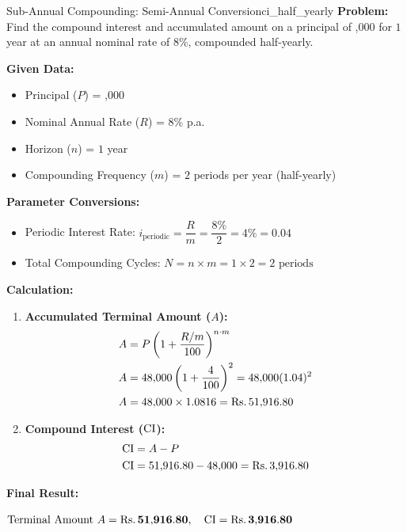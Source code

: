 \begin{example}{Sub-Annual Compounding: Semi-Annual Conversion}{ci_half_yearly}
\textbf{Problem:} \\
Find the compound interest and accumulated amount on a principal of ,000 for $1$ year at an annual nominal rate of $8\%$, compounded half-yearly.

\tcbline
\textbf{Given Data:}
\begin{itemize}[noitemsep]
    \item Principal ($P$) = ,000
    \item Nominal Annual Rate ($R$) = $8\%$ p.a.
    \item Horizon ($n$) = $1$ year
    \item Compounding Frequency ($m$) = $2$ periods per year (half-yearly)
\end{itemize}

\textbf{Parameter Conversions:}
\begin{itemize}[noitemsep]
    \item Periodic Interest Rate: $i_{\text{periodic}} = \dfrac{R}{m} = \dfrac{8\%}{2} = 4\% = 0.04$
    \item Total Compounding Cycles: $N = n \times m = 1 \times 2 = 2\text{ periods}$
\end{itemize}

\textbf{Calculation:}
\begin{enumerate}[leftmargin=*]
    \item \textbf{Accumulated Terminal Amount ($A$):}
    \begin{align*}
        A &= P\left(1 + \frac{R/m}{100}\right)^{n \cdot m} \\
        A &= 48{,}000\left(1 + \frac{4}{100}\right)^2 = 48{,}000(1.04)^2 \\
        A &= 48{,}000 \times 1.0816 = \text{Rs.}\, 51{,}916.80
    \end{align*}
    
    \item \textbf{Compound Interest ($\operatorname{CI}$):}
    \begin{align*}
        \operatorname{CI} &= A - P \\
        \operatorname{CI} &= 51{,}916.80 - 48{,}000 = \text{Rs.}\, 3{,}916.80
    \end{align*}
\end{enumerate}

\textbf{Final Result:}
\begin{center}
    $\text{Terminal Amount } A = \mathbf{\text{Rs.}\, 51{,}916.80}, \quad \operatorname{CI} = \mathbf{\text{Rs.}\, 3{,}916.80}$
\end{center}
\end{example}


